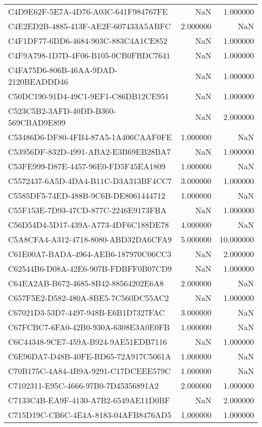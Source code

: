 \begin{tabular}{lrr}
C4D9E62F-5E7A-4D76-A03C-641F984767FE & NaN & 1.000000 \\
C4E2ED2B-4885-413F-AE2F-607433A5ABFC & 2.000000 & NaN \\
C4F1DF77-6DD6-4684-903C-883C4A1CE852 & NaN & 1.000000 \\
C4F9A798-1D7D-4F06-B105-0CB0FBDC7641 & NaN & 1.000000 \\
C4FA75D6-806B-46AA-9DAD-2120BEADDD46 & NaN & 1.000000 \\
C50DC190-91D4-49C1-9EF1-C86DB12CE951 & NaN & 1.000000 \\
C523C5B2-3AFD-40DD-B360-569CBAD9E899 & NaN & 2.000000 \\
C53486D6-DF80-4FB4-87A5-1A406CAAF0FE & 1.000000 & NaN \\
C53956DF-832D-4991-ABA2-E3B69EB28BA7 & NaN & 1.000000 \\
C53FE999-D87E-4457-96E0-FD5F45EA1809 & 1.000000 & NaN \\
C5572437-6A5D-4DA4-B11C-D3A313BF4CC7 & 3.000000 & 1.000000 \\
C5585DF5-74ED-488B-9C6B-DE8061444712 & 1.000000 & NaN \\
C55F153E-7D93-47CD-877C-2246E9173FBA & NaN & 1.000000 \\
C56D54D4-5D17-439A-A773-4DF6C188DE78 & 4.000000 & NaN \\
C5A8CFA4-A312-4718-8080-ABD32DA6CFA9 & 5.000000 & 10.000000 \\
C61E00A7-BADA-4964-AEB6-187970C06CC3 & NaN & 2.000000 \\
C62544B6-D08A-42E6-907B-FDBFF0B07CD9 & NaN & 1.000000 \\
C64EA2AB-B672-4685-8B42-88564202E6A8 & 2.000000 & NaN \\
C657F5E2-D582-480A-8BE5-7C560DC55AC2 & NaN & 1.000000 \\
C67021D3-53D7-4497-948B-E6B1D7327FAC & 3.000000 & NaN \\
C67FCBC7-6FA0-42B0-930A-6308E3A0E0FB & 1.000000 & NaN \\
C6C44348-9CE7-459A-B924-9AE51EDB7116 & NaN & 1.000000 \\
C6E96DA7-D48B-40FE-BD65-72A917C5061A & 1.000000 & NaN \\
C70B175C-4A84-4B9A-9291-C17DCEEE579C & 1.000000 & NaN \\
C7102311-E95C-4666-97B0-7D45356891A2 & 2.000000 & 1.000000 \\
C7133C4B-EA9F-4130-A7B2-6549AE11D0BF & NaN & 2.000000 \\
C715D19C-CB6C-4E4A-8183-04AFB8476AD5 & 1.000000 & 1.000000 \\

\end{tabular}
